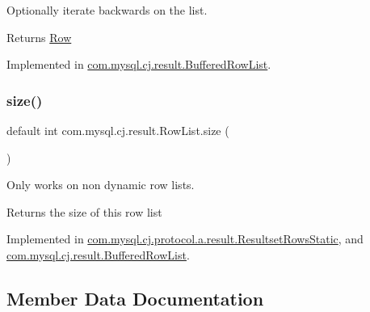 Optionally iterate backwards on the list.

\begin{DoxyReturn}{Returns}
\mbox{\hyperlink{interfacecom_1_1mysql_1_1cj_1_1result_1_1_row}{Row}} 
\end{DoxyReturn}


Implemented in \mbox{\hyperlink{classcom_1_1mysql_1_1cj_1_1result_1_1_buffered_row_list_a899cd7f256715f653cb2faa2d8026491}{com.\+mysql.\+cj.\+result.\+Buffered\+Row\+List}}.

\mbox{\label{interfacecom_1_1mysql_1_1cj_1_1result_1_1_row_list_a2b6e2d9ed59e362e06b9fc8a110ccd89}} 
\subsubsection{\texorpdfstring{size()}{size()}}
{\footnotesize\ttfamily default int com.\+mysql.\+cj.\+result.\+Row\+List.\+size (\begin{DoxyParamCaption}{ }\end{DoxyParamCaption})}

Only works on non dynamic row lists.

\begin{DoxyReturn}{Returns}
the size of this row list 
\end{DoxyReturn}


Implemented in \mbox{\hyperlink{classcom_1_1mysql_1_1cj_1_1protocol_1_1a_1_1result_1_1_resultset_rows_static_a1063d6dd64edbd0a400922e9c371ff5f}{com.\+mysql.\+cj.\+protocol.\+a.\+result.\+Resultset\+Rows\+Static}}, and \mbox{\hyperlink{classcom_1_1mysql_1_1cj_1_1result_1_1_buffered_row_list_a237ee911857a3afeb8641811508bb5b9}{com.\+mysql.\+cj.\+result.\+Buffered\+Row\+List}}.



\subsection{Member Data Documentation}
\mbox{\label{interfacecom_1_1mysql_1_1cj_1_1result_1_1_row_list_ab7beb738ba9b15d5697c610b86282ac9}} 
